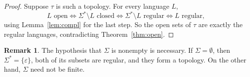 \documentclass[11pt]{article}
\theoremstyle{definition}
\newtheorem{remark}[theorem]{Remark}
\begin{document}
\begin{proof}
  Suppose $\tau$ is such a topology. For every language $L$,
  \[
    L \text{ open}
    \iff \Sigma^* \setminus L \text{ closed}
    \iff \Sigma^* \setminus L \text{ regular}
    \iff L \text{ regular},
  \]
  using Lemma~\ref{lem:compl} for the last step. So the open sets of $\tau$ are exactly the regular languages,
  contradicting Theorem~\ref{thm:open}.
\end{proof}

\begin{remark}
  The hypothesis that $\Sigma$ is nonempty is necessary. If $\Sigma = \emptyset$, then $\Sigma^* = \{ \varepsilon \}$,
  both of its subsets are regular, and they form a topology. On the other hand, $\Sigma$ need not be finite.
\end{remark}
\end{document}
